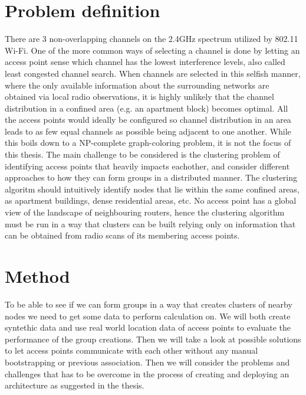 \section{Problem definition}
There are 3 non-overlapping channels on the 2.4GHz spectrum utilized by 802.11 Wi-Fi. One of the more common ways of selecting a channel
is done by letting an access point sense which channel has the lowest interference levels, also called least congested channel search.
When channels are selected in this selfish manner, where the only available information about the surrounding networks are obtained via
local radio observations, it is highly unlikely that the channel distribution in a confined area (e.g. an apartment block) becomes optimal.  
All the access points would ideally be configured so channel distribution in an area leads to as few equal channels as possible
being adjacent to one another. While this boils down to a NP-complete graph-coloring problem, it is not the focus of this thesis. 
The main challenge to be considered is the clustering problem of identifying access points that heavily impacts eachother, and consider different approaches to how 
they can form groups in a distributed manner. The clustering algoritm should intuitively identify nodes that lie within the same confined areas, as apartment buildings,
dense residential areas, etc. No access point has a global view of the landscape of neighbouring routers, hence the clustering algorithm must be run in a way that
clusters can be built relying only on information that can be obtained from radio scans of its membering access points. 

\section{Method}
To be able to see if we can form groups in a way that creates clusters of nearby nodes we need to get some data to perform
calculation on. We will both create syntethic data and use real world location data of access points to evaluate the performance of the group creations. 
Then we will take a look at possible solutions to let access points communicate with each other without any manual bootstrapping or 
previous association. Then we will consider the problems and challenges that has to be overcome in the process of creating and deploying 
an architecture as suggested in the thesis. 





